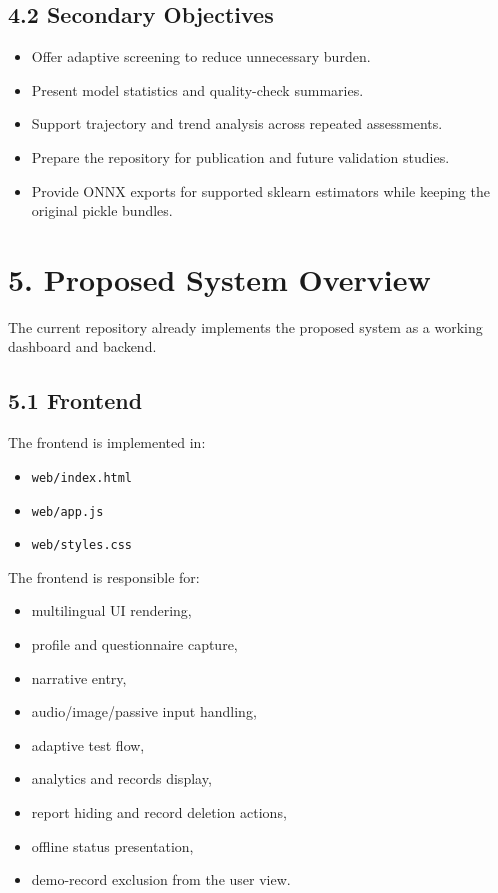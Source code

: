 \documentclass[11pt]{article}
\begin{document}
\subsection{4.2 Secondary Objectives}
\begin{itemize}[leftmargin=*]
  \item Offer adaptive screening to reduce unnecessary burden.
  \item Present model statistics and quality-check summaries.
  \item Support trajectory and trend analysis across repeated assessments.
  \item Prepare the repository for publication and future validation studies.
  \item Provide ONNX exports for supported sklearn estimators while keeping the original pickle bundles.
\end{itemize}

\section{5. Proposed System Overview}
The current repository already implements the proposed system as a working dashboard and backend.

\subsection{5.1 Frontend}
The frontend is implemented in:
\begin{itemize}[leftmargin=*]
  \item \texttt{web/index.html}
  \item \texttt{web/app.js}
  \item \texttt{web/styles.css}
\end{itemize}

The frontend is responsible for:
\begin{itemize}[leftmargin=*]
  \item multilingual UI rendering,
  \item profile and questionnaire capture,
  \item narrative entry,
  \item audio/image/passive input handling,
  \item adaptive test flow,
  \item analytics and records display,
  \item report hiding and record deletion actions,
  \item offline status presentation,
  \item demo-record exclusion from the user view.
\end{itemize}
\end{document}

